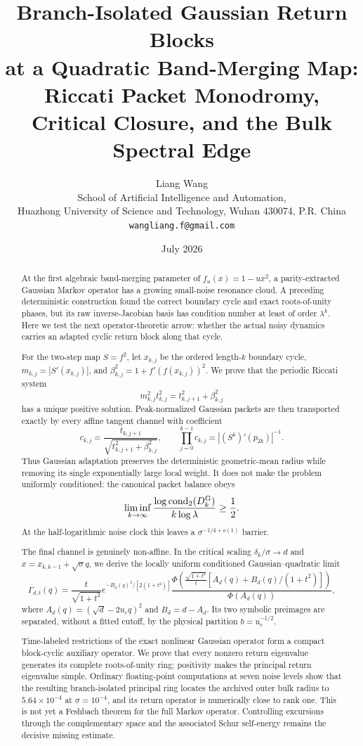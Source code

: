 \documentclass[11pt]{article}
\title{\textbf{Branch-Isolated Gaussian Return Blocks}\\
\textbf{at a Quadratic Band-Merging Map:}\\[0.35em]
\large Riccati Packet Monodromy, Critical Closure, and the Bulk Spectral Edge}
\author{Liang Wang\\
\small School of Artificial Intelligence and Automation,\\[-0.2em]
\small Huazhong University of Science and Technology, Wuhan 430074, P.R. China\\
\small \texttt{wangliang.f@gmail.com}}
\date{July 2026}
\theoremstyle{definition}
\theoremstyle{remark}
\newcommand{\uc}{u_{\mathrm c}}
\newcommand{\cond}{\operatorname{cond}_2}
\begin{document}
\maketitle

\begin{abstract}
At the first algebraic band-merging parameter of
$f_u(x)=1-u x^2$, a parity-extracted Gaussian Markov operator has a growing
small-noise resonance cloud.  A preceding deterministic construction found
the correct boundary cycle and exact roots-of-unity phases, but its raw
inverse-Jacobian basis has condition number at least of order $\lambda^k$.
Here we test the next operator-theoretic arrow: whether the actual noisy
dynamics carries an adapted cyclic return block along that cycle.

For the two-step map $S=f^2$, let $x_{k,j}$ be the ordered length-$k$
boundary cycle, $m_{k,j}=|S'(x_{k,j})|$, and
$\beta_{k,j}^2=1+f'(f(x_{k,j}))^2$.  We prove that the periodic Riccati
system
\[
 m_{k,j}^2t_{k,j}^2=t_{k,j+1}^2+\beta_{k,j}^2
\]
has a unique positive solution.  Peak-normalized Gaussian packets are then
transported exactly by every affine tangent channel with coefficient
\[
 c_{k,j}=\frac{t_{k,j+1}}
 {\sqrt{t_{k,j+1}^2+\beta_{k,j}^2}},
 \qquad
 \prod_{j=0}^{k-1}c_{k,j}=|(S^k)'(p_{2k})|^{-1}.
\]
Thus Gaussian adaptation preserves the deterministic geometric-mean radius
while removing its single exponentially large local weight.  It does not
make the problem uniformly conditioned: the canonical packet balance obeys
\[
 \liminf_{k\to\infty}
 \frac{\log\cond(D_k^{\rm G})}{k\log\lambda}\ge\frac12.
\]
At the half-logarithmic noise clock this leaves a
$\sigma^{-1/4+o(1)}$ barrier.

The final channel is genuinely non-affine.  In the critical scaling
$\delta_k/\sigma\to d$ and
$x=x_{k,k-1}+\sqrt\sigma q$, we derive the locally uniform conditioned
Gaussian--quadratic limit
\[
 \Gamma_{d,t}(q)=
 \frac{t}{\sqrt{1+t^2}}e^{-B_d(q)^2/[2(1+t^2)]}
 \frac{\Phi\!\left(\frac{\sqrt{1+t^2}}{t}
 [A_d(q)+B_d(q)/(1+t^2)]\right)}{\Phi(A_d(q))},
\]
where $A_d(q)=(\sqrt d-2\uc q)^2$ and $B_d=d-A_d$.
Its two symbolic preimages are separated, without a fitted cutoff, by the
physical partition $b=\uc^{-1/2}$.

Time-labeled restrictions of the exact nonlinear Gaussian operator form a
compact block-cyclic auxiliary operator.  We prove that every nonzero return
eigenvalue generates its complete roots-of-unity ring; positivity makes the
principal return eigenvalue simple.  Ordinary floating-point computations
at seven noise levels show that the resulting branch-isolated principal ring
locates the archived outer bulk radius to $5.64\times10^{-4}$ at
$\sigma=10^{-4}$, and its return operator is numerically close to rank one.
This is not yet a Feshbach theorem for the full Markov operator.  Controlling
excursions through the complementary space and the associated Schur
self-energy remains the decisive missing estimate.
\end{abstract}
\end{document}
